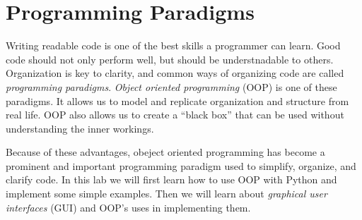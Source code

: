\label{lab:OOP}

\section*{Programming Paradigms}

Writing readable code is one of the best skills a programmer can learn.
Good code should not only perform well, but should be understnadable to others.
Organization is key to clarity, and common ways of organizing code are called \emph{programming paradigms}.
\emph{Object oriented programming} (OOP) is one of these paradigms.
It allows us to model and replicate organization and structure from real life.
OOP also allows us to create a ``black box'' that can be used without understanding the inner workings.

Because of these advantages, obeject oriented programming has become a prominent and important programming paradigm used to simplify, organize, and clarify code. 
In this lab we will first learn how to use OOP with Python and implement some simple examples. 
Then we will learn about \emph{graphical user interfaces} (GUI) and OOP's uses in implementing them.


\begin{comment}
A way of organizing a program is often called a ``paradigm."

Paradigms are designed to create better code by structuring or organizing the code in a more meaningful way.
Code without any structure is often referred to as ``spaghetti code.''
Spaghetti can be very easy to write, but very difficult to understand or modify.
\emph{Structured programming} emphasizes the use of programming structures to select or repeat the execution of blocks of code.
It is good practice to structure your programs in such a way that they are easy to understand, extend, or reuse.
Making extensive use of procedures (or subfunctions) is a characteristic of \emph{procedural programming}.
The work of the program is done in the subfunctions with one main function supervising the calling of each subfunction.

Another important, albeit specialized, paradigm is \li{object oriented programming} (or OOP).
The concept of object oriented programming is to model a problem as the interaction of a collection of objects.
There are many other paradigms such as declarative, event-driven, and array programming.
\end{comment}



